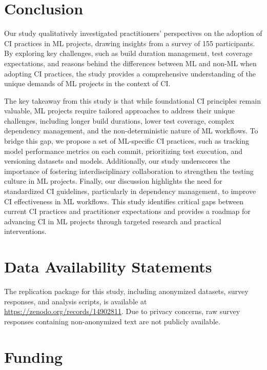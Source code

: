 

\section{Conclusion}
\label{sec:conclusion}

Our study qualitatively investigated practitioners' perspectives on the adoption of CI practices in ML projects, drawing insights from a survey of 155 participants. 
By exploring key challenges, such as build duration management, test coverage expectations, and reasons behind the differences between ML and non-ML when adopting CI practices, the study provides a comprehensive understanding of the unique demands of ML projects in the context of CI.

The key takeaway from this study is that while foundational CI principles remain valuable, ML projects require tailored approaches to address their unique challenges, including longer build durations, lower test coverage, complex dependency management, and the non-deterministic nature of ML workflows.
To bridge this gap, we propose a set of ML-specific CI practices, such as tracking model performance metrics on each commit, prioritizing test execution, and versioning datasets and models. Additionally, our study underscores the importance of fostering interdisciplinary collaboration to strengthen the testing culture in ML projects. Finally, our discussion highlights the need for standardized CI guidelines, particularly in dependency management, to improve CI effectiveness in ML workflows.
This study identifies critical gaps between current CI practices and practitioner expectations and provides a roadmap for advancing CI in ML projects through targeted research and practical interventions.

\section*{Data Availability Statements}

The replication package for this study, including anonymized datasets, survey responses, and analysis scripts, is available at \url{https://zenodo.org/records/14902811}.
Due to privacy concerns, raw survey responses containing non-anonymized text are not publicly available.

\section*{Funding}

